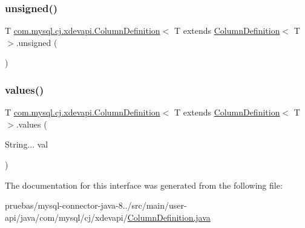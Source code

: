 \mbox{\label{interfacecom_1_1mysql_1_1cj_1_1xdevapi_1_1_column_definition_abe86aa00052be4e29734c7bdb429031a}} 
\subsubsection{\texorpdfstring{unsigned()}{unsigned()}}
{\footnotesize\ttfamily T \mbox{\hyperlink{interfacecom_1_1mysql_1_1cj_1_1protocol_1_1_column_definition}{com.\+mysql.\+cj.\+xdevapi.\+Column\+Definition}}$<$ T extends \mbox{\hyperlink{interfacecom_1_1mysql_1_1cj_1_1protocol_1_1_column_definition}{Column\+Definition}}$<$ T $>$.unsigned (\begin{DoxyParamCaption}{ }\end{DoxyParamCaption})}

\mbox{\label{interfacecom_1_1mysql_1_1cj_1_1xdevapi_1_1_column_definition_ab28c155a4120df4d53ed66cf19221524}} 
\subsubsection{\texorpdfstring{values()}{values()}}
{\footnotesize\ttfamily T \mbox{\hyperlink{interfacecom_1_1mysql_1_1cj_1_1protocol_1_1_column_definition}{com.\+mysql.\+cj.\+xdevapi.\+Column\+Definition}}$<$ T extends \mbox{\hyperlink{interfacecom_1_1mysql_1_1cj_1_1protocol_1_1_column_definition}{Column\+Definition}}$<$ T $>$.values (\begin{DoxyParamCaption}\item[{String...}]{val }\end{DoxyParamCaption})}



The documentation for this interface was generated from the following file\+:\begin{DoxyCompactItemize}
\item 
pruebas/mysql-\/connector-\/java-\/8../src/main/user-\/api/java/com/mysql/cj/xdevapi/\mbox{\hyperlink{user-api_2java_2com_2mysql_2cj_2xdevapi_2_column_definition_8java}{Column\+Definition.\+java}}\end{DoxyCompactItemize}

